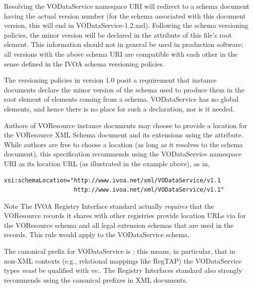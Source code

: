 \documentclass[11pt,a4paper]{ivoa}
\begin{document}
Resolving the VODataService namespace URI will redirect to a schema
document having the actual version number (for the schema associated
with this document version, this will end in VODataService-1.2.xsd).
Following the schema versioning policies, the minor version will be
declared in the  attribute of this file's root element.
This information should not in general be used in production software;
all versions with the above schema URI are compatible with each
other in the sense defined in the IVOA schema versioning policies.

The versioning policies in version 1.0 posit a requirement that instance
documents declare the minor version of the schema used to produce them
in the root element of elements coming from a schema.  VODataService has
no global elements, and hence there is no place for such a declaration,
nor is it needed.


Authors of VOResource instance documents may choose to
provide a location for the VOResource XML Schema document and its
extensions using the
 attribute.  While authors are free to
choose a location (as long as it resolves to the schema document), this
specification
recommends using the VODataService namespace URI as its location URL
(as illustrated in the example above), as in,

\begin{lstlisting}[language=XML]
xsi:schemaLocation="http://www.ivoa.net/xml/VODataService/v1.1
                    http://www.ivoa.net/xml/VODataService/v1.1"
\end{lstlisting}


\begin{admonition}{Note}
The IVOA Registry Interface standard \citep{2018ivoa.spec.0723D}
       actually \emph{requires} that the VOResource records it
       shares with other registries provide location URLs via
        for the VOResource schema and
       all legal extension schemas that are used in the records.  This
       rule would apply to the VODataService schema.
\end{admonition}


The canonical prefix for VODataService is ; this means, in
particular, that in non-XML contexts (e.g., relational mappings
like RegTAP) the VODataService types \emph{must} be qualified with
vs:.  The Registry Interfaces standard \citep{2018ivoa.spec.0723D} also
strongly recommends using the canonical prefixes in XML documents.
\end{document}
